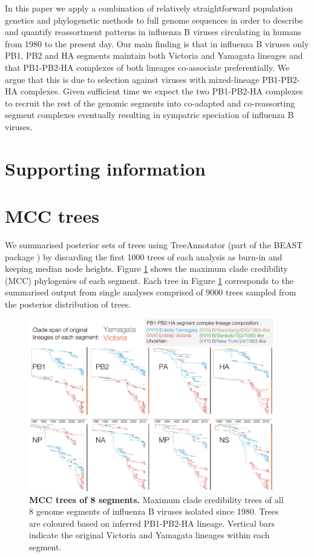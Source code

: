 \documentclass[11pt,oneside,letterpaper]{article}
\begin{document}
In this paper we apply a combination of relatively straightforward population genetics and phylogenetic methods to full genome sequences in order to describe and quantify reassortment patterns in influenza B viruses circulating in humans from 1980 to the present day.
Our main finding is that in influenza B viruses only PB1, PB2 and HA segments maintain both Victoria and Yamagata lineages and that PB1-PB2-HA complexes of both lineages co-associate preferentially. 
We argue that this is due to selection against viruses with mixed-lineage PB1-PB2-HA complexes.
Given sufficient time we expect the two PB1-PB2-HA complexes to recruit the rest of the genomic segments into co-adapted and co-reassorting segment complexes eventually resulting in sympatric speciation of influenza B viruses.

\newpage

\section*{Supporting information}
\setcounter{figure}{0}
\setcounter{table}{0}
\renewcommand{\thefigure}{S\arabic{figure}}
\renewcommand{\thetable}{S\arabic{table}}


\section*{MCC trees}

We summarised posterior sets of trees using TreeAnnotator (part of the BEAST package \cite{drummond2012}) by discarding the first 1000 trees of each analysis as burn-in and keeping median node heights.
Figure \ref{genomeGrid} shows the maximum clade credibility (MCC) phylogenies of each segment.
Each tree in Figure \ref{genomeGrid} corresponds to the summarised output from single analyses comprised of 9000 trees sampled from the posterior distribution of trees.

\begin{figure}
\centering  
\includegraphics[width=0.95\textwidth]  {supp_figures/InfB_genomeGrid.pdf}
\caption{\textbf{MCC trees of 8 segments.}
Maximum clade credibility trees of all 8 genome segments of influenza B viruses isolated since 1980.
Trees are coloured based on inferred PB1-PB2-HA lineage.
Vertical bars indicate the original Victoria and Yamagata lineages within each segment.}
\label{genomeGrid}
\end{figure}
\end{document}

